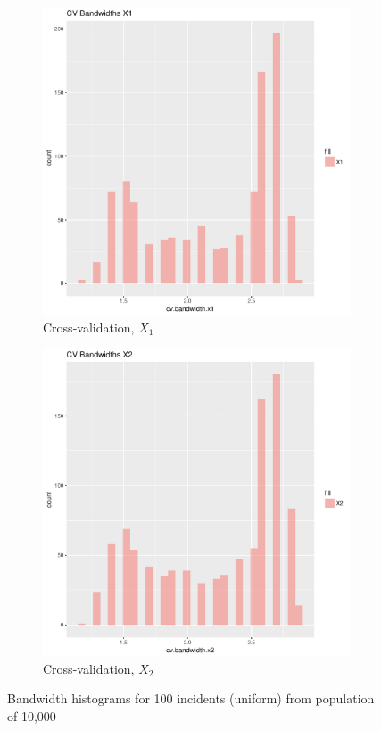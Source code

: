 \begin{figure}[htbp]
\begin{subfigure}[b]{0.3\textwidth}
    \includegraphics[width=\textwidth]{results/unif_100_unif/output/bandwidths-x1}
    \caption{Cross-validation, \(X_1\)}
    \label{fig:bandwidths_x1:unif_100_unif:x1}
    \end{subfigure}
    \begin{subfigure}[b]{0.3\textwidth}
    \includegraphics[width=\textwidth]{results/unif_100_unif/output/bandwidths-x2}
    \caption{Cross-validation, \(X_2\)}
    \label{fig:bandwidths_x1:unif_100_unif:x2}
    \end{subfigure}
    \caption{Bandwidth histograms for 100 incidents (uniform) from population of 10,000}
\end{figure}


